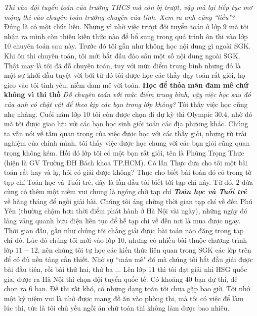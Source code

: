 \begin{multicols}{2}
	\vskip 0.1cm
	\textit{Thi vào đội tuyển toán của trường THCS mà còn bị trượt, vậy mà lại tiếp tục mơ mộng thi vào chuyên toán trường chuyên của tỉnh. Xem ra anh cũng ``liều"?} 
	\vskip 0.1cm
	Đúng là có một chút liều. Nhưng vì nhờ việc trượt đội tuyển toán ở lớp $9$ mà tôi nhận ra mình còn thiếu kiến thức nào để bổ sung trong quá trình ôn thi vào lớp $10$ chuyên toán sau này. Trước đó tôi gần như không học nội dung gì ngoài SGK. Khi ôn thi chuyên toán, tôi mới bắt đầu đào sâu một số nội dung ngoài SGK.
	\vskip 0.1cm
	Thật may là tôi đã đỗ chuyên toán, tuy với mức điểm trung bình nhưng đó là một sự khởi đầu tuyệt vời bởi từ đó tôi được học các thầy dạy toán rất giỏi, họ gieo vào tôi tình yêu, niềm đam mê với toán. 
	\vskip 0.1cm
	\textbf{\color{diendantoanhoc}Học để thỏa mãn đam mê chứ không vì thi thố}
	\vskip 0.1cm
	\textit{Đỗ chuyên toán với mức điểm trung bình, vậy việc học sau đó của anh có chật vật để theo kịp các bạn trong lớp không?}
	\vskip 0.1cm
	Tôi thấy việc học cũng nhẹ nhàng. Cuối năm lớp $10$ tôi còn được chọn đi dự kỳ thi Olympic $30.4$, nhờ đó mà tôi được giao lưu với các bạn học sinh giỏi toán các địa phương khác. Chúng ta vẫn nói về tầm quan trọng của việc được học với các thầy giỏi, nhưng từ trải nghiệm của chính mình, tôi thấy việc được học chung với các bạn giỏi cũng quan trọng không kém. 
	\vskip 0.1cm
	Hồi đó lớp tôi có một bạn rất giỏi, tên là Phùng Trọng Thực (hiện là GV Trường ĐH Bách khoa TP.HCM). Có lần Thực đưa cho tôi một bài toán rất hay và lạ, hỏi có giải được không? Thực cho biết bài toán đó có trong tờ tạp chí Toán học và Tuổi trẻ, đây là lần đầu tôi biết tới tạp chí này. Từ đó, $2$ đứa cùng có thêm một niềm vui chung là ngóng chờ tạp chí \textbf{\color{diendantoanhoc}\textit{Toán học và Tuổi trẻ}} về hàng tháng để ngồi giải bài. Chúng tôi áng chừng thời gian tạp chí về đến Phú Yên (thường chậm hơn thời điểm phát hành ở Hà Nội vài ngày), những ngày đó lảng vảng quanh bưu điện liên tục để hễ tạp chí về đến nơi là mua được ngay. 
	\vskip 0.1cm
	Thời gian đầu, gần như chúng tôi chẳng giải được bài toán nào đăng trong tạp chí đó. Lúc đó chúng tôi mới vào lớp $10$, nhưng có nhiều bài thuộc chương trình lớp $11-12$, nên chúng tôi tự học các kiến thức liên quan trong SGK các lớp trên để có đủ nền tảng cần thiết. Nhờ sự ``máu mê" đó mà chúng tôi bắt đầu giải được bài đầu tiên, rồi bài thứ  hai, thứ ba ...
	\vskip 0.1cm 
	Lên lớp $11$ thì tôi đạt giải nhì HSG quốc gia, được ra Hà Nội thi chọn đội tuyển quốc tế. Có khoảng $40$ bạn dự thi, để chọn ra $6$ bạn. Đề thi rất khó, có những dạng toán tôi chưa gặp bao giờ. Tôi nhớ một kỷ niệm vui là nhờ được mang đồ ăn vào phòng thi, mà tôi có việc để làm lúc thi, tức là tôi chủ yếu ngồi ăn chứ toán thì không làm được bao nhiêu.  

\end{multicols}
